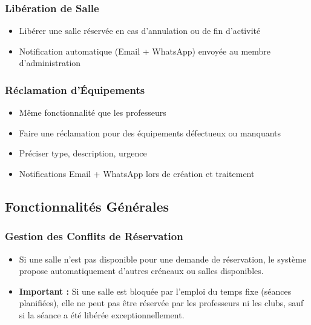 \documentclass[12pt,a4paper]{article}
\begin{document}
\subsubsection{Libération de Salle}
\begin{itemize}
    \item Libérer une salle réservée en cas d'annulation ou de fin d'activité
    \item Notification automatique (Email + WhatsApp) envoyée au membre d'administration
\end{itemize}

\subsubsection{Réclamation d'Équipements}
\begin{itemize}
    \item Même fonctionnalité que les professeurs
    \item Faire une réclamation pour des équipements défectueux ou manquants
    \item Préciser type, description, urgence
    \item Notifications Email + WhatsApp lors de création et traitement
\end{itemize}

\subsection{Fonctionnalités Générales}

\subsubsection{Gestion des Conflits de Réservation}
\begin{itemize}
    \item Si une salle n'est pas disponible pour une demande de réservation, le système propose automatiquement d'autres créneaux ou salles disponibles.
    \item \textbf{Important :} Si une salle est bloquée par l'emploi du temps fixe (séances planifiées), elle ne peut pas être réservée par les professeurs ni les clubs, sauf si la séance a été libérée exceptionnellement.
\end{itemize}
\end{document}
